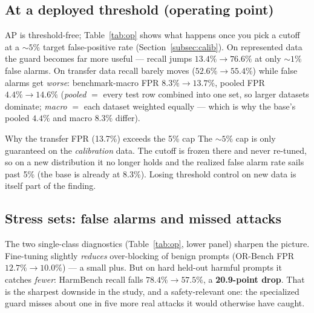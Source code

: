 \documentclass[11pt]{article}
\begin{document}
\subsection{At a deployed threshold (operating point)}
AP is threshold-free; Table~\ref{tab:op} shows what happens once you pick a cutoff at a
${\sim}5\%$ target false-positive rate (Section~\ref{subsec:calib}). On represented data the
guard becomes far more useful --- recall jumps $13.4\%\!\to\!76.6\%$ at only ${\sim}1\%$ false
alarms. On transfer data recall barely moves ($52.6\%\!\to\!55.4\%$) while false alarms get
\emph{worse}: benchmark-macro FPR $8.3\%\!\to\!13.7\%$, pooled FPR $4.4\%\!\to\!14.6\%$
(\emph{pooled} $=$ every test row combined into one set, so larger datasets dominate;
\emph{macro} $=$ each dataset weighted equally --- which is why the base's pooled $4.4\%$ and
macro $8.3\%$ differ).

\begin{takeaway}{Why the transfer FPR (13.7\%) exceeds the 5\% cap}
\small
The ${\sim}5\%$ cap is only guaranteed on the \emph{calibration} data. The cutoff is frozen
there and never re-tuned, so on a new distribution it no longer holds and the realized false
alarm rate sails past 5\% (the base is already at 8.3\%). Losing threshold control on new data
is itself part of the finding.
\end{takeaway}

\subsection{Stress sets: false alarms and missed attacks}
The two single-class diagnostics (Table~\ref{tab:op}, lower panel) sharpen the picture.
Fine-tuning slightly \emph{reduces} over-blocking of benign prompts (OR-Bench FPR
$12.7\%\!\to\!10.0\%$) --- a small plus. But on hard held-out harmful prompts it catches
\emph{fewer}: HarmBench recall falls $78.4\%\!\to\!57.5\%$, a \textbf{20.9-point drop}. That is
the sharpest downside in the study, and a safety-relevant one: the specialized guard misses
about one in five more real attacks it would otherwise have caught.
\end{document}
